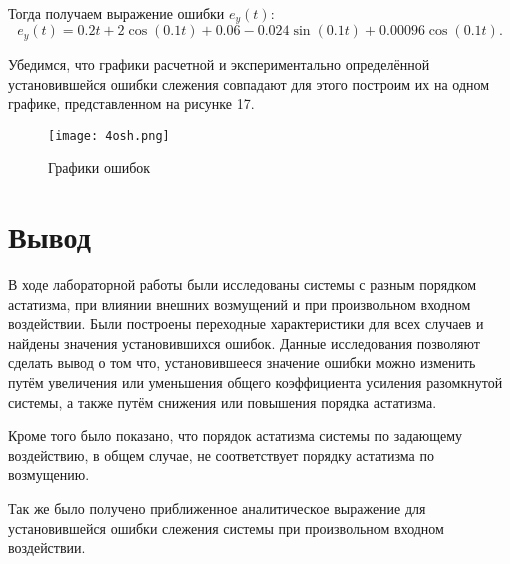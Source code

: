 \documentclass[12pt,a4paper]{article}
\begin{document}
Тогда получаем выражение ошибки $e_y(t)$:
\begin{equation}
e_y(t) = 0.2t+2\cos(0.1t)+0.06-0.024\sin(0.1t)+0.00096\cos(0.1t).
\end{equation}\par
Убедимся, что графики расчетной и экспериментально определённой установившейся ошибки слежения совпадают для этого построим их на одном графике, представленном на рисунке 17.
\begin{figure}[H]
    \centering
    \texttt{[image: 4osh.png]}
    \caption{Графики ошибок}
\end{figure}

\newpage
\section*{Вывод}
В ходе лабораторной работы были исследованы системы с разным порядком астатизма, при влиянии внешних возмущений и при произвольном входном воздействии. Были построены переходные характеристики для всех случаев и найдены значения установившихся ошибок. Данные исследования позволяют сделать вывод о том что, установившееся значение ошибки можно изменить путём увеличения или уменьшения общего коэффициента усиления разомкнутой системы, а также путём снижения или повышения порядка астатизма.\par
Кроме того было показано, что порядок астатизма системы по задающему воздействию, в общем случае, не соответствует порядку астатизма по возмущению.\par
Так же было получено приближенное аналитическое выражение для установившейся ошибки слежения системы при произвольном входном воздействии.
\end{document}
